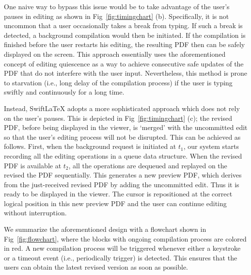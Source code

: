 \documentclass[sigconf]{acmart}
\begin{document}

One naive way to bypass this issue would be to take advantage of the user's pauses in editing as shown in Fig~\ref{fig:timingchart} (b). 
Specifically, it is not uncommon that a user occasionally takes a break from typing.
If such a break is detected, a background compilation would then be initiated.
If the compilation is finished before the user restarts his editing, the resulting PDF then can be safely displayed on the screen. This approach essentially uses the aforementioned concept of editing quiescence as a way to achieve consecutive safe updates of the PDF that do not interfere with the user input.
Nevertheless, this method is prone to starvation (i.e., long delay of the compilation process) if the user is typing swiftly and continuously for a long time.

Instead, SwiftLaTeX adopts a more sophisticated approach which does not rely on the user's pauses.
This is depicted in Fig~\ref{fig:timingchart} (c); the revised PDF, before being displayed in the viewer, is `merged' with the uncommitted edit so that the user's editing process will not be disrupted.
This can be achieved as follows.  
First, when the background request is initiated at $t_1$, our system starts recording all the editing operations in a queue data structure.
When the revised PDF is available at $t_2$, all the operations are dequeued  and replayed on the revised the PDF sequentially.
This generates a new preview PDF, which derives from the just-received revised PDF by adding the uncommitted edit.
Thus it is ready to be displayed in the viewer. The cursor is repositioned at the correct logical position in this new preview PDF and the user can continue editing without interruption.



We summarize the aforementioned design with a flowchart shown in Fig~\ref{fig:flowchart}, where the blocks with ongoing compilation process are colored in red. A new compilation process will be triggered whenever either a keystroke or a timeout event (i.e., periodically trigger) is detected. This ensures that the users can obtain the latest revised version as soon as possible.
\end{document}
